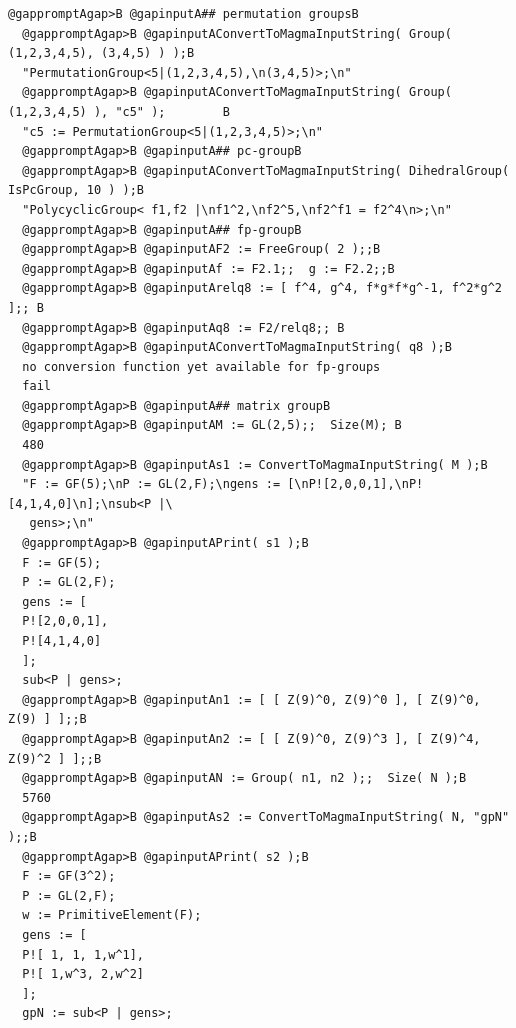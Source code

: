 \documentclass[a4paper,11pt]{report}
\begin{document}
{{\begin{Verbatim}[commandchars=@AB,fontsize=\small,frame=single,label=Example]
  @gappromptAgap>B @gapinputA## permutation groupsB
  @gappromptAgap>B @gapinputAConvertToMagmaInputString( Group( (1,2,3,4,5), (3,4,5) ) );B
  "PermutationGroup<5|(1,2,3,4,5),\n(3,4,5)>;\n"
  @gappromptAgap>B @gapinputAConvertToMagmaInputString( Group( (1,2,3,4,5) ), "c5" );        B
  "c5 := PermutationGroup<5|(1,2,3,4,5)>;\n"
  @gappromptAgap>B @gapinputA## pc-groupB
  @gappromptAgap>B @gapinputAConvertToMagmaInputString( DihedralGroup( IsPcGroup, 10 ) );B
  "PolycyclicGroup< f1,f2 |\nf1^2,\nf2^5,\nf2^f1 = f2^4\n>;\n"
  @gappromptAgap>B @gapinputA## fp-groupB
  @gappromptAgap>B @gapinputAF2 := FreeGroup( 2 );;B
  @gappromptAgap>B @gapinputAf := F2.1;;  g := F2.2;;B
  @gappromptAgap>B @gapinputArelq8 := [ f^4, g^4, f*g*f*g^-1, f^2*g^2 ];; B
  @gappromptAgap>B @gapinputAq8 := F2/relq8;; B
  @gappromptAgap>B @gapinputAConvertToMagmaInputString( q8 );B
  no conversion function yet available for fp-groups
  fail
  @gappromptAgap>B @gapinputA## matrix groupB
  @gappromptAgap>B @gapinputAM := GL(2,5);;  Size(M); B
  480
  @gappromptAgap>B @gapinputAs1 := ConvertToMagmaInputString( M );B
  "F := GF(5);\nP := GL(2,F);\ngens := [\nP![2,0,0,1],\nP![4,1,4,0]\n];\nsub<P |\
   gens>;\n"
  @gappromptAgap>B @gapinputAPrint( s1 );B
  F := GF(5);
  P := GL(2,F);
  gens := [
  P![2,0,0,1],
  P![4,1,4,0]
  ];
  sub<P | gens>;
  @gappromptAgap>B @gapinputAn1 := [ [ Z(9)^0, Z(9)^0 ], [ Z(9)^0, Z(9) ] ];;B
  @gappromptAgap>B @gapinputAn2 := [ [ Z(9)^0, Z(9)^3 ], [ Z(9)^4, Z(9)^2 ] ];;B
  @gappromptAgap>B @gapinputAN := Group( n1, n2 );;  Size( N );B
  5760
  @gappromptAgap>B @gapinputAs2 := ConvertToMagmaInputString( N, "gpN" );;B
  @gappromptAgap>B @gapinputAPrint( s2 );B
  F := GF(3^2);
  P := GL(2,F);
  w := PrimitiveElement(F);
  gens := [
  P![ 1, 1, 1,w^1],
  P![ 1,w^3, 2,w^2]
  ];
  gpN := sub<P | gens>;
  
\end{Verbatim}
 }

 }

         
\end{document}
